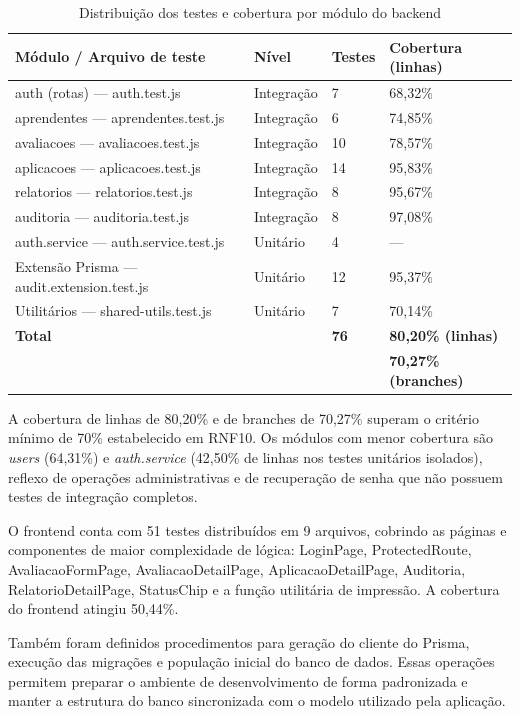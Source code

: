 \begin{table}[H]
\centering
\small
\begin{tabular}{p{5cm} p{2.2cm} p{2.5cm} p{2.5cm}}
\hline
\textbf{Módulo / Arquivo de teste} & \textbf{Nível} & \textbf{Testes} & \textbf{Cobertura (linhas)} \\
\hline
auth (rotas) — auth.test.js & Integração & 7 & 68,32\% \\
aprendentes — aprendentes.test.js & Integração & 6 & 74,85\% \\
avaliacoes — avaliacoes.test.js & Integração & 10 & 78,57\% \\
aplicacoes — aplicacoes.test.js & Integração & 14 & 95,83\% \\
relatorios — relatorios.test.js & Integração & 8 & 95,67\% \\
auditoria — auditoria.test.js & Integração & 8 & 97,08\% \\
auth.service — auth.service.test.js & Unitário & 4 & — \\
Extensão Prisma — audit.extension.test.js & Unitário & 12 & 95,37\% \\
Utilitários — shared-utils.test.js & Unitário & 7 & 70,14\% \\
\hline
\textbf{Total} & & \textbf{76} & \textbf{80,20\% (linhas)} \\
 & & & \textbf{70,27\% (branches)} \\
\hline
\end{tabular}
\caption{Distribuição dos testes e cobertura por módulo do backend}
\label{tab:testes_backend}
\end{table}

A cobertura de linhas de 80,20\% e de branches de 70,27\% superam o critério mínimo de 70\% estabelecido em RNF10. Os módulos com menor cobertura são \textit{users} (64,31\%) e \textit{auth.service} (42,50\% de linhas nos testes unitários isolados), reflexo de operações administrativas e de recuperação de senha que não possuem testes de integração completos.

O frontend conta com 51 testes distribuídos em 9 arquivos, cobrindo as páginas e componentes de maior complexidade de lógica: LoginPage, ProtectedRoute, AvaliacaoFormPage, AvaliacaoDetailPage, AplicacaoDetailPage, Auditoria, RelatorioDetailPage, StatusChip e a função utilitária de impressão. A cobertura do frontend atingiu 50,44\%.

Também foram definidos procedimentos para geração do cliente do Prisma, execução das migrações e população inicial do banco de dados. Essas operações permitem preparar o ambiente de desenvolvimento de forma padronizada e manter a estrutura do banco sincronizada com o modelo utilizado pela aplicação.

